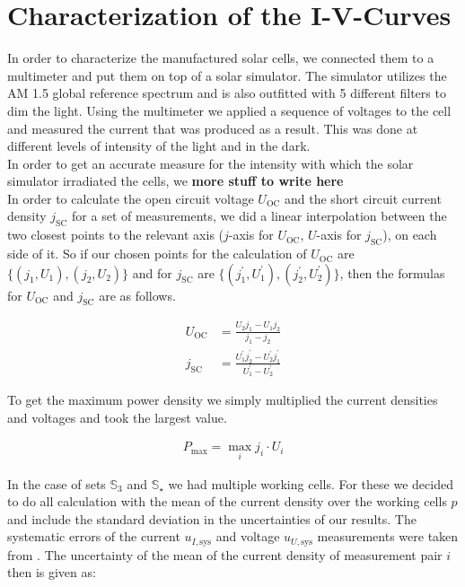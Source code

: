 
\newcommand{\Uoc}{U_{\text{OC}}}
\newcommand{\jsc}{j_{\text{SC}}}
\newcommand{\Pmax}{P_{\text{max}}}
\newcommand{\meanp}[1]{\langle #1 \rangle_p}

\section{Characterization of the I-V-Curves}\label{sec:charac}

In order to characterize the manufactured solar cells, we connected them to a multimeter and put them on top of a solar simulator. The simulator utilizes the AM 1.5 global reference spectrum and is also outfitted with 5 different filters to dim the light. Using the multimeter we applied a sequence of voltages to the cell and measured the current that was produced as a result. This was done at different levels of intensity of the light and in the dark.\\
In order to get an accurate measure for the intensity with which the solar simulator irradiated the cells, we \textbf{more stuff to write here}\\
In order to calculate the open circuit voltage $\Uoc$ and the short circuit current density $\jsc$ for a set of measurements, we did a linear interpolation between the two closest points to the relevant axis ($j$-axis for $\Uoc$, $U$-axis for $\jsc$), on each side of it. So if our chosen points for the calculation of $\Uoc$ are $\{(j_1,U_1),(j_2,U_2)\}$ and for $\jsc$ are $\{(j_1^\prime,U_1^\prime),(j_2^\prime,U_2^\prime)\}$, then the formulas for $\Uoc$ and $\jsc$ are as follows.

\begin{align}
\Uoc &= \frac{U_2 j_1 - U_1 j_2}{j_1-j_2}\\
\jsc &= \frac{U_1^\prime j_2^\prime - U_2^\prime j_1^\prime}{U_1^\prime-U_2^\prime}
\end{align}

To get the maximum power density we simply multiplied the current densities and voltages and took the largest value.

\begin{align}
\Pmax = \max_{i} j_i\cdot U_i
\end{align}

In the case of sets $\mathbb{S}_3$ and $\mathbb{S}_\star$ we had multiple working cells. For these we decided to do all calculation with the mean of the current density over the working cells $p$ and include the standard deviation in the uncertainties of our results. The systematic errors of the current $u_{I,\text{sys}}$ and voltage $u_{U,\text{sys}}$ measurements were taken from \cite{keithley}. The uncertainty of the mean of the current density of measurement pair $i$ then is given as:


